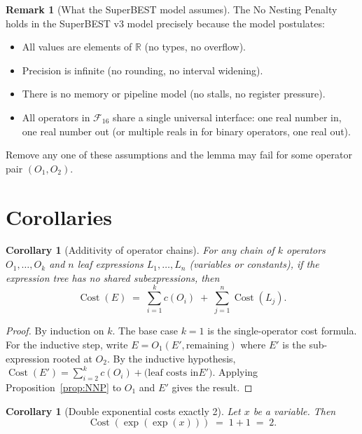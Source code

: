 \documentclass[12pt,a4paper]{article}
\newtheorem{corollary}[theorem]{Corollary}
\theoremstyle{definition}
\newtheorem{remark}[theorem]{Remark}
\newcommand{\Cost}{\operatorname{Cost}}
\newcommand{\uc}[1]{c(#1)}   %
\begin{document}
\begin{remark}[What the SuperBEST model assumes]
The No Nesting Penalty holds in the SuperBEST v3 model precisely because
the model postulates:
\begin{itemize}
  \item All values are elements of $\mathbb{R}$ (no types, no overflow).
  \item Precision is infinite (no rounding, no interval widening).
  \item There is no memory or pipeline model (no stalls, no register
        pressure).
  \item All operators in $\mathcal{F}_{16}$ share a single universal
        interface: one real number in, one real number out (or multiple
        reals in for binary operators, one real out).
\end{itemize}
Remove any one of these assumptions and the lemma may fail for some
operator pair $(O_1, O_2)$.
\end{remark}

\section{Corollaries}
\label{sec:corollaries}

\begin{corollary}[Additivity of operator chains]
\label{cor:chain}
For any chain of $k$ operators $O_1, \ldots, O_k$ and $n$ leaf
expressions $L_1, \ldots, L_n$ (variables or constants), if the
expression tree has no shared subexpressions, then
\[
  \Cost(E) \;=\; \sum_{i=1}^{k} \uc{O_i} \;+\; \sum_{j=1}^{n} \Cost(L_j).
\]
\end{corollary}

\begin{proof}
By induction on $k$.  The base case $k = 1$ is the single-operator cost
formula.  For the inductive step, write $E = O_1(E', \text{remaining})$
where $E'$ is the sub-expression rooted at $O_2$.  By the inductive
hypothesis, $\Cost(E') = \sum_{i=2}^{k} \uc{O_i} + \text{(leaf costs in
} E')$.  Applying Proposition~\ref{prop:NNP} to $O_1$ and $E'$ gives the
result.
\end{proof}

\begin{corollary}[Double exponential costs exactly 2]
\label{cor:double-exp}
Let $x$ be a variable.  Then
\[
  \Cost(\exp(\exp(x))) \;=\; 1 + 1 \;=\; 2.
\]
\end{corollary}
\end{document}
